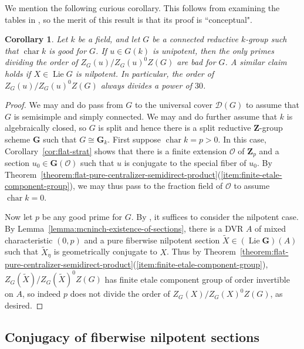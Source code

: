 \documentclass[11pt,reqno]{amsart}
\newtheorem{cor}[theorem]{Corollary}
\theoremstyle{definition}
\newcommand{\bG}{{\mathbf G}}
\newcommand{\bZ}{{\mathbf Z}}
\newcommand{\sD}{{\mathscr D}}
\newcommand{\sO}{{\mathscr O}}
\DeclareMathOperator{\chara}{char}
\DeclareMathOperator{\Lie}{Lie}
\begin{document}
We mention the following curious corollary. This follows from examining the tables in \cite{Liebeck-Seitz}, so the merit of this result is that its proof is ``conceptual".

\begin{cor}\label{cor:unip-comp-gp}
Let $k$ be a field, and let $G$ be a connected reductive $k$-group such that $\chara k$ is good for $G$. If $u \in G(k)$ is unipotent, then the only primes dividing the order of $Z_G(u)/Z_G(u)^0Z(G)$ are bad for $G$. A similar claim holds if $X \in \Lie G$ is nilpotent. In particular, the order of $Z_G(u)/Z_G(u)^0Z(G)$ always divides a power of $30$.
\end{cor}

\begin{proof}
We may and do pass from $G$ to the universal cover $\sD(G)$ to assume that $G$ is semisimple and simply connected. We may and do further assume that $k$ is algebraically closed, so $G$ is split and hence there is a split reductive $\bZ$-group scheme $\bG$ such that $G \cong \bG_k$. First suppose $\chara k = p > 0$. In this case, Corollary~\ref{cor:flat-strat} shows that there is a finite extension $\sO$ of $\bZ_p$ and a section $u_0 \in \bG(\sO)$ such that $u$ is conjugate to the special fiber of $u_0$. By Theorem~\ref{theorem:flat-pure-centralizer-semidirect-product}(\ref{item:finite-etale-component-group}), we may thus pass to the fraction field of $\sO$ to assume $\chara k = 0$. \smallskip

Now let $p$ be any good prime for $G$. By \cite[Thm.\ 5.1]{Integral-Springer}, it suffices to consider the nilpotent case. By Lemma~\ref{lemma:mcninch-existence-of-sections}, there is a DVR $A$ of mixed characteristic $(0, p)$ and a pure fiberwise nilpotent section $\widetilde{X} \in (\Lie \bG)(A)$ such that $\widetilde{X}_\eta$ is geometrically conjugate to $X$. Thus by Theorem~\ref{theorem:flat-pure-centralizer-semidirect-product}(\ref{item:finite-etale-component-group}), $Z_G(\widetilde{X})/Z_G(\widetilde{X})^0Z(G)$ has finite etale component group of order invertible on $A$, so indeed $p$ does not divide the order of $Z_G(X)/Z_G(X)^0Z(G)$, as desired.
\end{proof}







\subsection{Conjugacy of fiberwise nilpotent sections}
\end{document}
